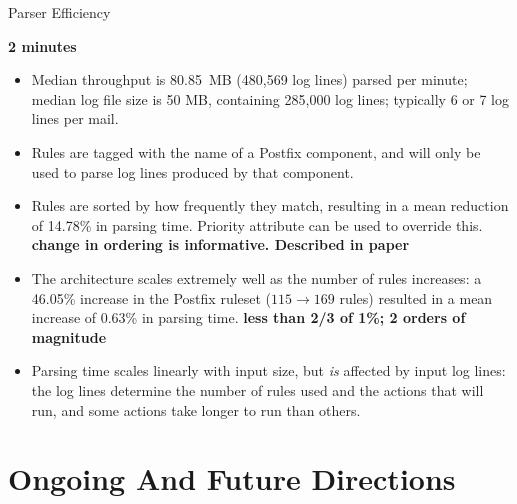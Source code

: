 \documentclass{beamer}
\newcommand{\timingnote}[1]{%
    \textbf{#1}%
}
\begin{document}
\begin{frame}{Parser Efficiency}

    \timingnote{2 minutes}

    \begin{itemize}

        \item Median throughput is 80.85~MB (480,569 log lines) parsed per
            minute; median log file size is 50 MB, containing 285,000 log
            lines; typically 6 or 7 log lines per mail.

        \item Rules are tagged with the name of a Postfix component, and
            will only be used to parse log lines produced by that
            component.

        \item Rules are sorted by how frequently they match, resulting in a
            mean reduction of 14.78\% in parsing time.  Priority attribute
            can be used to override this.  \timingnote{change in ordering
            is informative.  Described in paper}

        \item The architecture scales extremely well as the number of rules
            increases: a 46.05\% increase in the Postfix ruleset ($115
            \rightarrow{} 169$ rules) resulted in a mean increase of 0.63\%
            in parsing time.  \timingnote{less than 2/3 of 1\%; 2 orders of
            magnitude}

        \item Parsing time scales linearly with input size, but
            \textit{is\/} affected by input log lines: the log lines
            determine the number of rules used and the actions that will
            run, and some actions take longer to run than others.

    \end{itemize}

\end{frame}

\section{Ongoing And Future Directions}
\end{document}

